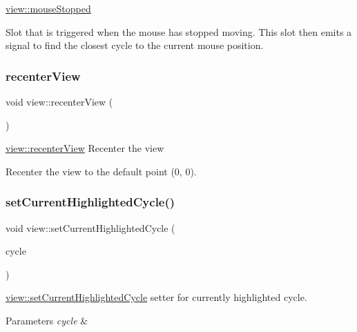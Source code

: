 \mbox{\hyperlink{classview_ab1d79ebdee961d5ec07ed11f461158a5}{view\+::mouse\+Stopped}} 

Slot that is triggered when the mouse has stopped moving. This slot then emits a signal to find the closest cycle to the current mouse position. \mbox{\label{classview_a7fff213d7f38eeb2c8943609264fa518}} 
\subsubsection{\texorpdfstring{recenter\+View}{recenterView}}
{\footnotesize\ttfamily void view\+::recenter\+View (\begin{DoxyParamCaption}{ }\end{DoxyParamCaption})\hspace{0.3cm}{\ttfamily [slot]}}



\mbox{\hyperlink{classview_a7fff213d7f38eeb2c8943609264fa518}{view\+::recenter\+View}} Recenter the view 

Recenter the view to the default point (0, 0). \mbox{\label{classview_a69ba93a57967891ba91517b9fd50e369}} 
\subsubsection{\texorpdfstring{set\+Current\+Highlighted\+Cycle()}{setCurrentHighlightedCycle()}}
{\footnotesize\ttfamily void view\+::set\+Current\+Highlighted\+Cycle (\begin{DoxyParamCaption}\item[{const Q\+Pointer$<$ \mbox{\hyperlink{classgraphic_cycle}{graphic\+Cycle}} $>$}]{cycle }\end{DoxyParamCaption})}



\mbox{\hyperlink{classview_a69ba93a57967891ba91517b9fd50e369}{view\+::set\+Current\+Highlighted\+Cycle}} setter for currently highlighted cycle. 


\begin{DoxyParams}{Parameters}
{\em cycle} & \\
\hline
\end{DoxyParams}
\mbox{\label{classview_a78e6621aad0346c49fc9d9e0e4f268f5}} 
